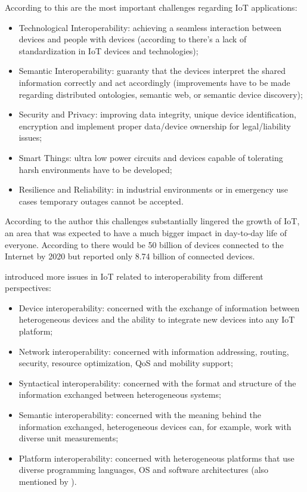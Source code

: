According to \cite{7073822} this are the most important challenges regarding \gls{IoT} applications:

\begin{itemize}
    \item Technological Interoperability: achieving a seamless interaction between devices and people with devices (according to \cite{al2016iot} there's a lack of standardization in \gls{IoT} devices and technologies);
    \item Semantic Interoperability: guaranty that the devices interpret the shared information
correctly and act accordingly (improvements have to be made regarding distributed ontologies, semantic web, or semantic device discovery);
    \item Security and Privacy: improving data integrity, unique device identification, encryption and implement proper data/device ownership for legal/liability issues;
    \item Smart Things: ultra low power circuits and devices capable of tolerating harsh environments have to be developed;
    \item Resilience and Reliability: in industrial environments or in emergency use cases temporary outages cannot be accepted.
\end{itemize}

According to the author this challenges substantially lingered the growth of \gls{IoT}, an area that was expected to have a much bigger impact in day-to-day life of everyone. According to \cite{iot-cisco-prediction} there would be 50 billion of devices connected to the Internet by 2020 but \cite{statista-number-devices} reported only 8.74 billion of connected devices.

\cite{noura2019interoperability} introduced more issues in \gls{IoT} related to interoperability from different perspectives:

\begin{itemize}
    \item Device interoperability: concerned with the exchange of information between heterogeneous devices and the ability to integrate new devices into any \gls{IoT} platform;
    \item Network interoperability: concerned with information addressing, routing, security, resource optimization, \gls{QoS} and mobility support;
    \item Syntactical interoperability: concerned with the format and structure of the information exchanged between heterogeneous systems;
    \item Semantic interoperability: concerned with the meaning behind the information exchanged, heterogeneous devices can, for example, work with diverse unit measurements;
    \item Platform interoperability: concerned with heterogeneous platforms that use diverse programming languages, \gls{OS} and software architectures (also mentioned by \cite{KOO20224191, SILVA2018697, DIAS2022100529, RAY201635}).
\end{itemize}

